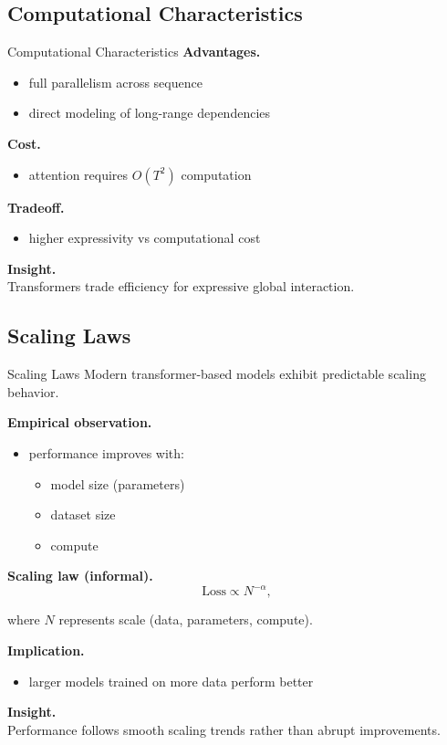 \documentclass[aspectratio=169,11pt]{beamer}
\begin{document}
\subsection{Computational Characteristics}
\begin{frame}[t,allowframebreaks]{Computational Characteristics}
\small
\textbf{Advantages.}\\ \begin{itemize}
    \item full parallelism across sequence
    \item direct modeling of long-range dependencies
\end{itemize}

\textbf{Cost.}\\ \begin{itemize}
    \item attention requires $O(T^2)$ computation
\end{itemize}

\textbf{Tradeoff.}\\ \begin{itemize}
    \item higher expressivity vs computational cost
\end{itemize}

\textbf{Insight.}\\ Transformers trade efficiency for expressive global interaction.
\end{frame}

\subsection{Scaling Laws}
\begin{frame}[t,allowframebreaks]{Scaling Laws}
\small
Modern transformer-based models exhibit predictable scaling behavior.

\textbf{Empirical observation.}\\ \begin{itemize}
    \item performance improves with:
    \begin{itemize}
        \item model size (parameters)
        \item dataset size
        \item compute
    \end{itemize}
\end{itemize}

\textbf{Scaling law (informal).}\\ \[
\text{Loss} \propto N^{-\alpha},
\]

where $N$ represents scale (data, parameters, compute).

\textbf{Implication.}\\ \begin{itemize}
    \item larger models trained on more data perform better
\end{itemize}

\textbf{Insight.}\\ Performance follows smooth scaling trends rather than abrupt improvements.
\end{frame}
\end{document}
